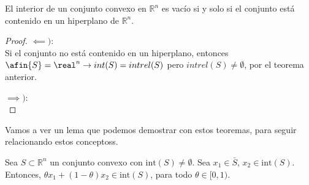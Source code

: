 \begin{theorem}
El interior de un conjunto convexo  en $\mathbb{R}^n$ es vacío si y solo si el conjunto está contenido en un hiperplano de $\mathbb{R}^n$.
\end{theorem}

\begin{proof}
$\impliedby)$:\\ Si el conjunto no está contenido en un hiperplano, entonces $\afin{S} = \real^n \to int(S) = intrel(S)$ pero $ intrel(S) ≠ \emptyset$, por el teorema anterior.

$\implies)$:\\

\end{proof}


Vamos a ver un lema que podemos demostrar con estos teoremas, para seguir relacionando estos conceptoss.


\begin{lemma}
Sea $S\subset\mathbb{R}^n$ un conjunto convexo con $\mbox{int}(S)\neq\emptyset$. Sea $x_1\in \bar{S}$, $x_2\in\mbox{int}(S)$. Entonces, $\theta x_1+ (1-\theta) x_2 \in\mbox{int}(S)$, para todo $\theta\in [0,1)$.
\end{lemma}

